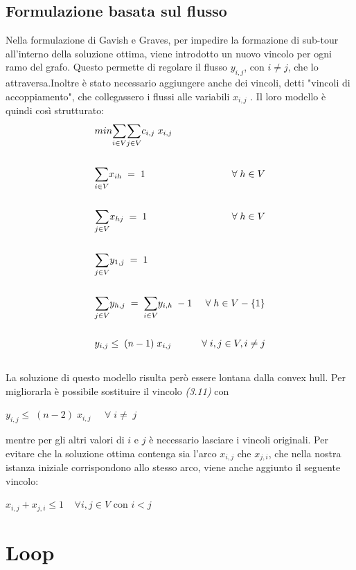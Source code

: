 \subsection{Formulazione basata sul flusso}
Nella formulazione di Gavish e Graves, per impedire la formazione di sub-tour all'interno della soluzione ottima, viene introdotto un nuovo vincolo per ogni ramo del grafo. Questo permette di regolare il flusso $y_{i,j}$, con $i\neq j$,  che lo attraversa.Inoltre è stato necessario aggiungere anche dei vincoli, detti "vincoli di accoppiamento", che collegassero i flussi alle variabili $x_{i,j}$ . Il loro modello è quindi così strutturato:
\begin{align}
& min\underset{i\in V}\sum{\underset{j\in V}\sum{c_{i,j}\; x_{i,j}}} \\ \notag \\
& \underset{i\in V}\sum{x_{ih}}\;=\;1 & \forall\;h\in V \\ \notag\\
& \underset{j\in V}\sum{x_{hj}}\;=\;1 & \forall\;h\in V \\ \notag\\
& \underset{j\in V}\sum{y_{1,j}}\;=\;1\\ \notag\\
& \underset{j\in V}\sum{y_{h,j}}\;=\;\underset{i\in V}\sum{y_{i,h}}\;-1 & \forall\;h\in V-\{1\}\\ \notag\\
& y_{i,j}\leq\;(n-1)\;x_{i,j} & \forall\;i,j\in V, i\neq j\\ \notag
\end{align}
La soluzione di questo modello risulta però essere lontana dalla convex hull. Per migliorarla è possibile sostituire il vincolo \textit{(3.11)} con \\
\begin{center}
$y_{i,j}\leq\;(n-2)\;x_{i,j} \;\;\;\;\;\forall\; i\neq \; j$\\
\end{center}
mentre per gli altri valori di $i$ e $j$ è necessario lasciare i vincoli originali. 
Per evitare che la soluzione ottima contenga sia l'arco $x_{i,j}$ che $x_{j,i}$, che nella nostra istanza iniziale corrispondono allo stesso arco, viene anche aggiunto il seguente vincolo:
\begin{center}
$x_{i,j}+x_{j,i}\leq 1\;\;\;\; \forall i,j \in V$ con $i < j$
\end{center}

\section{Loop}
